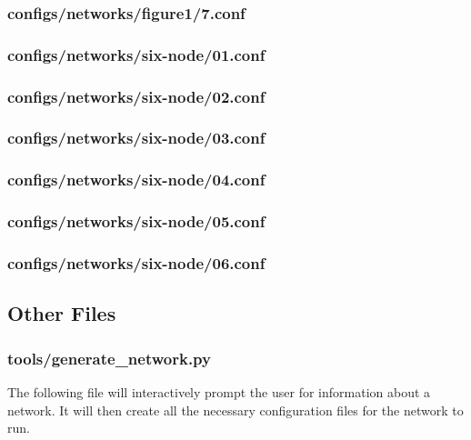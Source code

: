 \documentclass[11pt]{article} %
\begin{document}
\subsubsection{configs/networks/figure1/7.conf} \label{figure1-end}


\subsubsection{configs/networks/six-node/01.conf} \label{six-node-start}


\subsubsection{configs/networks/six-node/02.conf}


\subsubsection{configs/networks/six-node/03.conf}


\subsubsection{configs/networks/six-node/04.conf}


\subsubsection{configs/networks/six-node/05.conf}


\subsubsection{configs/networks/six-node/06.conf} \label{six-node-end}


\newpage
\subsection{Other Files}

\subsubsection{tools/generate\_network.py} \label{generatenet}
The following file will interactively prompt the user for information about a network. It will then create all the necessary configuration files for the network to run.

\end{document}
